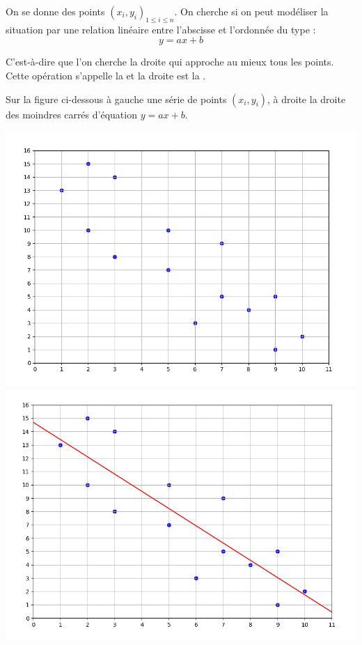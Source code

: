 \documentclass[11pt,class=report,crop=false]{standalone}
\begin{document}
\begin{cours}

On se donne des points $(x_i,y_i)_{1\le i \le n}$. 
On cherche si on peut modéliser la situation par une relation linéaire entre l'abscisse et l'ordonnée du type :
$$y = ax+b$$



C'est-à-dire que l'on cherche la droite qui \og{}approche\fg{} au mieux tous les points.
Cette opération s'appelle la  et la droite est la .

Sur la figure ci-dessous à gauche une série de points $(x_i,y_i)$, à droite la droite des moindres carrés d'équation $y=ax+b$.
\begin{center}
	\includegraphics[scale=\myscale,scale=0.25]{cours-regression-1}	\quad
	\includegraphics[scale=\myscale,scale=0.25]{cours-regression-2}
\end{center}



\end{cours}
\end{document}
